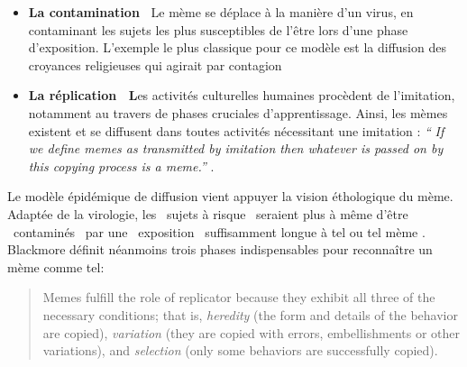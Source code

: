 \begin{itemize}
\item
\textbf{La contamination~\newline
}Le mème se déplace à la manière d{\textquoteright}un virus, en contaminant les sujets les plus susceptibles de l{\textquoteright}être lors d{\textquoteright}une phase d{\textquoteright}exposition. L{\textquoteright}exemple le plus classique pour ce modèle est la diffusion des croyances religieuses
qui agirait par contagion \citep{Dennett2006}
\item
\textbf{La réplication~\newline
L}es activités culturelles humaines procèdent de l{\textquoteright}imitation, notamment au travers de phases cruciales d{\textquoteright}apprentissage. Ainsi, les mèmes existent et se diffusent dans toutes activités nécessitant une imitation : \textit{{\textquotedblleft}} \textit{If we define memes as transmitted by imitation then whatever is passed on by this copying process is a meme.{\textquotedblright} }\citep{Blackmore2006}. 
\end{itemize}

Le modèle épidémique de diffusion vient appuyer la vision éthologique du mème. Adaptée de la virologie, les {\guillemotleft}~sujets à risque~{\guillemotright} seraient plus à même d{\textquoteright}être {\guillemotleft}~contaminés~{\guillemotright} par une {\guillemotleft}~exposition~{\guillemotright} suffisamment longue à tel ou tel mème \citep{Wang2011}. Blackmore définit néanmoins trois phases indispensables pour reconna\^itre un mème comme tel:  

\begin{quote}
Memes fulfill the role of replicator because they exhibit all three of the necessary conditions; that is, \textit{heredity} (the form and details of the behavior are copied), \textit{variation} (they are copied with errors, embellishments or other variations), and \textit{selection} (only some behaviors are
successfully copied). \citep{Blackmore2006}
\end{quote}

